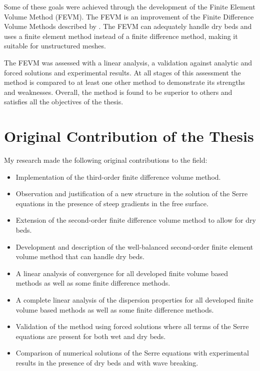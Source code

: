 Some of these goals were achieved through the development of the Finite Element Volume Method (FEVM). The FEVM is an improvement of the Finite Difference Volume Methods described by \citet{Zoppou-2014}. The FEVM can adequately handle dry beds and uses a finite element method instead of a finite difference method, making it suitable for unstructured meshes. 

The FEVM was assessed with a linear analysis, a validation against analytic and forced solutions and experimental results. At all stages of this assessment the method is compared to at least one other method to demonstrate its strengths and weaknesses. Overall, the method is found to be superior to others and satisfies all the objectives of the thesis.

\section{Original Contribution of the Thesis}
My research made the following original contributions to the field:
\begin{itemize}
	\item Implementation of the third-order finite difference volume method.
	\item Observation and justification of a new structure in the solution of the Serre equations in the presence of steep gradients in the free surface.
	\item Extension of the second-order finite difference volume method to allow for dry beds.
	\item Development and description of the well-balanced second-order finite element volume method that can handle dry beds.
	\item A linear analysis of convergence for all developed finite volume based methods as well as some finite difference methods.
	\item A complete linear analysis of the dispersion properties for all developed finite volume based methods as well as some finite difference methods.
	\item Validation of the method using forced solutions where all terms of the Serre equations are present for both wet and dry beds.
	\item Comparison of numerical solutions of the Serre equations with experimental results in the presence of dry beds and with wave breaking. 
\end{itemize}

